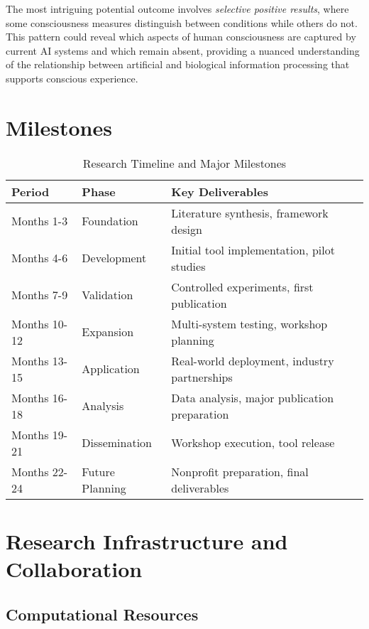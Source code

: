 \documentclass[11pt,a4paper]{article}
\begin{document}
The most intriguing potential outcome involves \textit{selective positive results}, where some consciousness measures distinguish between conditions while others do not. This pattern could reveal which aspects of human consciousness are captured by current AI systems and which remain absent, providing a nuanced understanding of the relationship between artificial and biological information processing that supports conscious experience.

\section{Milestones}
\begin{table}[h]
    \centering
    \begin{tabular}{|l|l|p{8cm}|}
    \hline
    \textbf{Period} & \textbf{Phase} & \textbf{Key Deliverables} \\
    \hline
    Months 1-3 & Foundation & Literature synthesis, framework design \\
    \hline
    Months 4-6 & Development & Initial tool implementation, pilot studies \\
    \hline
    Months 7-9 & Validation & Controlled experiments, first publication \\
    \hline
    Months 10-12 & Expansion & Multi-system testing, workshop planning \\
    \hline
    Months 13-15 & Application & Real-world deployment, industry partnerships \\
    \hline
    Months 16-18 & Analysis & Data analysis, major publication preparation \\
    \hline
    Months 19-21 & Dissemination & Workshop execution, tool release \\
    \hline
    Months 22-24 & Future Planning & Nonprofit preparation, final deliverables \\
    \hline
    \end{tabular}
    \caption{Research Timeline and Major Milestones}
    \label{tab:timeline}
    \end{table}
    \section{Research Infrastructure and Collaboration}

    \subsection{Computational Resources}
    
\end{document}
